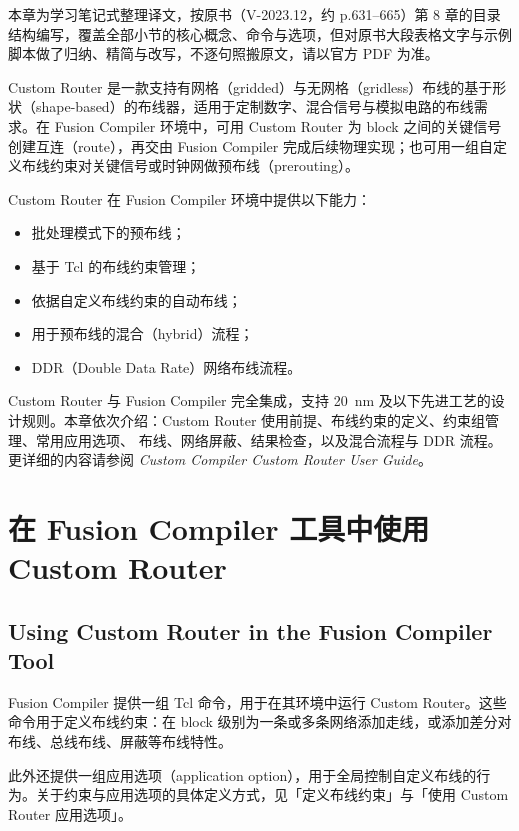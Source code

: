 \label{chap:customroute}

\begin{noteBox}
本章为学习笔记式整理译文，按原书（V-2023.12，约 p.631--665）第 8 章的目录结构编写，覆盖全部小节的核心概念、命令与选项，但对原书大段表格文字与示例脚本做了归纳、精简与改写，不逐句照搬原文，请以官方 PDF 为准。
\end{noteBox}

Custom Router 是一款支持有网格（gridded）与无网格（gridless）布线的基于形状（shape-based）的布线器，适用于定制数字、混合信号与模拟电路的布线需求。在 Fusion Compiler 环境中，可用 Custom Router 为 block 之间的关键信号创建互连（route），再交由 Fusion Compiler 完成后续物理实现；也可用一组自定义布线约束对关键信号或时钟网做预布线（prerouting）。

Custom Router 在 Fusion Compiler 环境中提供以下能力：
\begin{itemize}
  \item 批处理模式下的预布线；
  \item 基于 Tcl 的布线约束管理；
  \item 依据自定义布线约束的自动布线；
  \item 用于预布线的混合（hybrid）流程；
  \item DDR（Double Data Rate）网络布线流程。
\end{itemize}

Custom Router 与 Fusion Compiler 完全集成，支持 20~nm 及以下先进工艺的设计规则。本章依次介绍：Custom Router 使用前提、布线约束的定义、约束组管理、常用应用选项、 布线、网络屏蔽、结果检查，以及混合流程与 DDR 流程。更详细的内容请参阅 \textit{Custom Compiler Custom Router User Guide}。

\section{在 Fusion Compiler 工具中使用 Custom Router}
\subsection*{Using Custom Router in the Fusion Compiler Tool}

Fusion Compiler 提供一组 Tcl 命令，用于在其环境中运行 Custom Router。这些命令用于定义布线约束：在 block 级别为一条或多条网络添加走线，或添加差分对布线、总线布线、屏蔽等布线特性。

此外还提供一组应用选项（application option），用于全局控制自定义布线的行为。关于约束与应用选项的具体定义方式，见「定义布线约束」与「使用 Custom Router 应用选项」。

